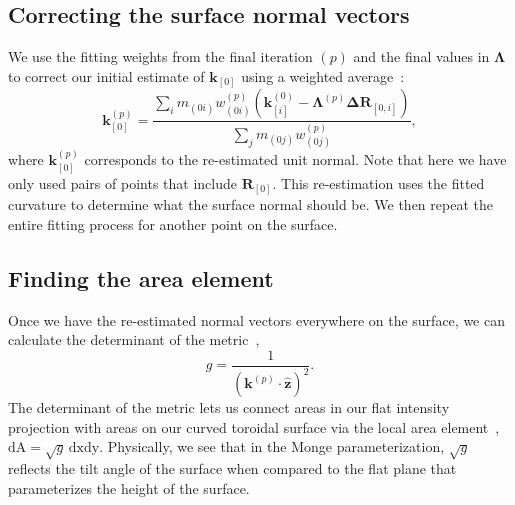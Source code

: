 \subsection{Correcting the surface normal vectors}
We use the fitting weights from the final iteration $(p)$ and the final values in $\bm{\Lambda}$ to correct our initial estimate of $\mathbf{k}_{[0]}$ using a weighted average~\cite{RN31}:
\begin{equation}
\mathbf{k}_{[0]}^{(p)} = \frac{\sum\limits_i m_{(0i)}w_{(0i)}^{(p)}(\mathbf{k}_{[i]}^{(0)} - \mathbf{\Lambda}^{(p)}\mathbf{\Delta R}_{[0,i]})}{\sum\limits_j m_{(0j)}w_{(0j)}^{(p)}},
\end{equation}
where $\mathbf{k}_{[0]}^{(p)}$ corresponds to the re-estimated unit normal.
Note that here we have only used pairs of points that include $\mathbf{R}_{[0]}$.
This re-estimation uses the fitted curvature to determine what the surface normal should be.
We then repeat the entire fitting process for another point on the surface.


\subsection{Finding the area element}
Once we have the re-estimated normal vectors everywhere on the surface, we can calculate the determinant of the metric~\cite{RN35},
\begin{equation}
g = \frac{1}{(\mathbf{k}^{(p)} \cdot \mathbf{\hat{z}})^2}.
\end{equation}
The determinant of the metric lets us connect areas in our flat intensity projection with areas on our curved toroidal surface via the local area element~\cite{RN35}, $\textrm{dA} = \sqrt{g} \, \textrm{dx}\textrm{dy}$.
Physically, we see that in the Monge parameterization, $\sqrt{g}$ reflects the tilt angle of the surface when compared to the flat plane that parameterizes the height of the surface.


